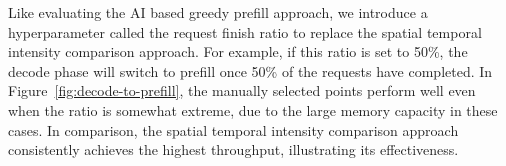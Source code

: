 Like evaluating the AI based greedy prefill approach, we introduce a hyperparameter called the request finish ratio to replace the spatial temporal intensity comparison approach.
For example, if this ratio is set to 50\%, the decode phase will switch to prefill once 50\% of the requests have completed.
In Figure~\ref{fig:decode-to-prefill}, the manually selected points perform well even when the ratio is somewhat extreme, due to the large memory capacity in these cases.
In comparison, the spatial temporal intensity comparison approach consistently achieves the highest throughput, illustrating its effectiveness.



